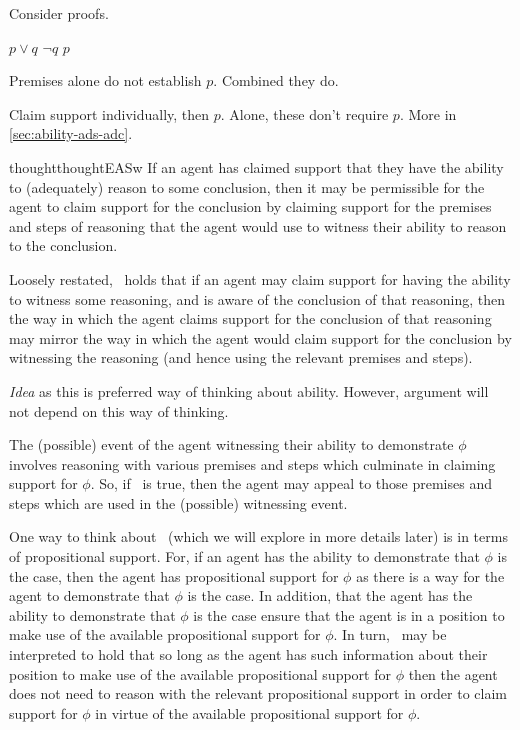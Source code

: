 \begin{note}
  Consider proofs.

  \(p \lor q\)
  \(\lnot q\)
  \(p\)

  Premises alone do not establish \(p\).
  Combined they do.

  Claim support individually, then \(p\).
  Alone, these don't require \(p\).
  More in \autoref{sec:ability-ads-adc}.
\end{note}

\begin{note}[\EASw{}]
    \begin{restatable}{thought}{thoughtEASw}\label{thought:EASw}
    If an agent has claimed support that they have the ability to (adequately) reason to some conclusion, then it may be permissible for the agent to claim support for the conclusion by claiming support for the premises and steps of reasoning that the agent would use to witness their ability to reason to the conclusion.
  \end{restatable}

  Loosely restated,~\EASw{} holds that if an agent may claim support for having the ability to witness some reasoning, and is aware of the conclusion of that reasoning, then the way in which the agent claims support for the conclusion of that reasoning may mirror the way in which the agent would claim support for the conclusion by witnessing the reasoning (and hence using the relevant premises and steps).
\end{note}

\begin{note}
  \emph{Idea} as this is preferred way of thinking about ability.
  However, argument will not depend on this way of thinking.
\end{note}

\begin{note}
  The (possible) event of the agent witnessing their ability to demonstrate \(\phi\) involves reasoning with various premises and steps which culminate in claiming support for \(\phi\).
  So, if~\EASw{} is true, then the agent may appeal to those premises and steps which are used in the (possible) witnessing event.

  One way to think about~\EASw{} (which we will explore in more details later) is in terms of propositional support.
  For, if an agent has the ability to demonstrate that \(\phi\) is the case, then the agent has propositional support for \(\phi\) as there is a way for the agent to demonstrate that \(\phi\) is the case.
  In addition, that the agent has the ability to demonstrate that \(\phi\) is the case ensure that the agent is in a position to make use of the available propositional support for \(\phi\).
  In turn,~\EAS{} may be interpreted to hold that so long as the agent has such information about their position to make use of the available propositional support for \(\phi\) then the agent does not need to reason with the relevant propositional support in order to claim support for \(\phi\) in virtue of the available propositional support for \(\phi\).
\end{note}

